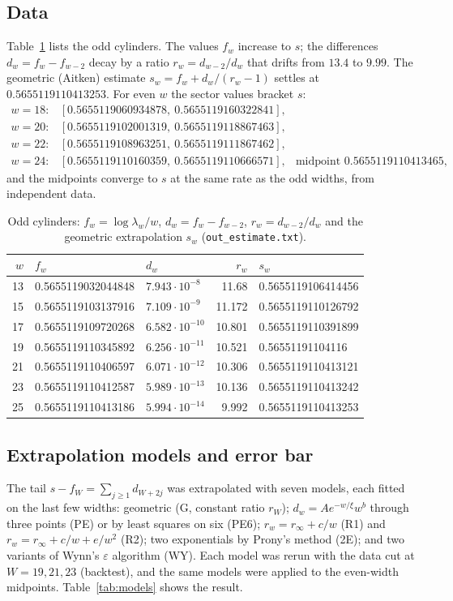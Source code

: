 \documentclass[11pt]{amsart}
\theoremstyle{definition}
\theoremstyle{remark}
\newcommand{\file}[1]{\texttt{#1}}
\begin{document}
\subsection{Data}
Table~\ref{tab:odd} lists the odd cylinders. The values $f_w$ increase to $s$; the differences
$d_w = f_w - f_{w-2}$ decay by a ratio $r_w = d_{w-2}/d_w$ that drifts from $13.4$ to $9.99$.
The geometric (Aitken) estimate $s_w = f_w + d_w/(r_w - 1)$ settles at $0.5655119110413253$.
For even $w$ the sector values bracket $s$:
\[
\begin{array}{rll}
  w = 18: & [0.5655119060934878,\ 0.5655119160322841], \\
  w = 20: & [0.5655119102001319,\ 0.5655119118867463], \\
  w = 22: & [0.5655119108963251,\ 0.5655119111867462], \\
  w = 24: & [0.5655119110160359,\ 0.5655119110666571], & \text{midpoint } 0.5655119110413465,
\end{array}
\]
and the midpoints converge to $s$ at the same rate as the odd widths, from independent data.

\begin{table}[ht]
\caption{Odd cylinders: $f_w = \log\lambda_w / w$, $d_w = f_w - f_{w-2}$, $r_w = d_{w-2}/d_w$ and the
geometric extrapolation $s_w$ (\file{out\_estimate.txt}).}\label{tab:odd}
\begin{tabular}{rllrl}
\toprule
$w$ & $f_w$ & $d_w$ & $r_w$ & $s_w$ \\
\midrule
13 & 0.5655119032044848 & $7.943\cdot10^{-8}$  & 11.68 & 0.5655119106414456 \\
15 & 0.5655119103137916 & $7.109\cdot10^{-9}$  & 11.172 & 0.5655119110126792 \\
17 & 0.5655119109720268 & $6.582\cdot10^{-10}$ & 10.801 & 0.5655119110391899 \\
19 & 0.5655119110345892 & $6.256\cdot10^{-11}$ & 10.521 & 0.56551191104116 \\
21 & 0.5655119110406597 & $6.071\cdot10^{-12}$ & 10.306 & 0.5655119110413121 \\
23 & 0.5655119110412587 & $5.989\cdot10^{-13}$ & 10.136 & 0.5655119110413242 \\
25 & 0.5655119110413186 & $5.994\cdot10^{-14}$ &  9.992 & 0.5655119110413253 \\
\bottomrule
\end{tabular}
\end{table}

\subsection{Extrapolation models and error bar}
The tail $s - f_W = \sum_{j \ge 1} d_{W + 2j}$ was extrapolated with seven models, each fitted
on the last few widths: geometric (G, constant ratio $r_W$); $d_w = A e^{-w/\xi} w^b$ through
three points (PE) or by least squares on six (PE6); $r_w = r_\infty + c/w$ (R1) and
$r_w = r_\infty + c/w + e/w^2$ (R2); two exponentials by Prony's method (2E); and two variants of
Wynn's $\varepsilon$ algorithm (WY). Each model was rerun with the data cut at $W = 19, 21, 23$
(backtest), and the same models were applied to the even-width midpoints. Table~\ref{tab:models}
shows the result.
\end{document}
